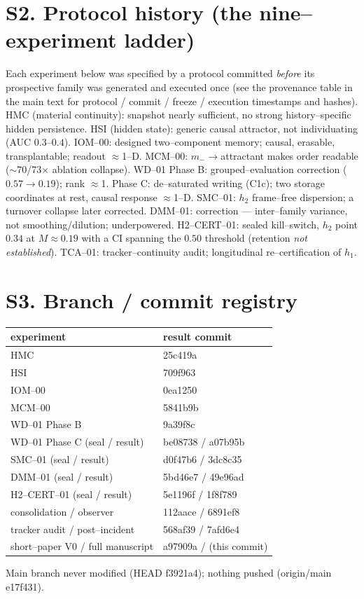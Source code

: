 \documentclass[11pt]{article}
\begin{document}
\section{S2. Protocol history (the nine--experiment ladder)}
Each experiment below was specified by a protocol committed \emph{before} its prospective family was
generated and executed once (see the provenance table in the main text for protocol / commit / freeze /
execution timestamps and hashes). HMC (material continuity): snapshot nearly sufficient, no strong
history--specific hidden persistence. HSI (hidden state): generic causal attractor, not individuating
(AUC $0.3$--$0.4$). IOM--00: designed two--component memory; causal, erasable, transplantable; readout
$\approx$1--D. MCM--00: $m_-\!\to$attractant makes order readable ($\sim$70/73$\times$ ablation collapse).
WD--01 Phase B: grouped--evaluation correction ($0.57\to0.19$); rank $\approx$1. Phase C: de--saturated
writing (C1c); two storage coordinates at rest, causal response $\approx$1--D. SMC--01: $h_2$ frame--free
dispersion; a turnover collapse later corrected. DMM--01: correction --- inter--family variance, not
smoothing/dilution; underpowered. H2--CERT--01: sealed kill--switch, $h_2$ point $0.34$ at $M\approx0.19$
with a CI spanning the $0.50$ threshold (retention \emph{not established}). TCA--01: tracker--continuity
audit; longitudinal re--certification of $h_1$.

\section{S3. Branch / commit registry}
\begin{longtable}{@{}ll@{}}\toprule experiment & result commit\\\midrule
HMC & 25c419a\\ HSI & 709f963\\ IOM--00 & 0ea1250\\ MCM--00 & 5841b9b\\ WD--01 Phase B & 9a39f8c\\
WD--01 Phase C (seal / result) & be08738 / a07b95b\\ SMC--01 (seal / result) & d0f47b6 / 3dc8c35\\
DMM--01 (seal / result) & 5bd46e7 / 49e96ad\\ H2--CERT--01 (seal / result) & 5e1196f / 1f8f789\\
consolidation / observer & 112aace / 6891ef8\\ tracker audit / post--incident & 568af39 / 7afd6e4\\
short--paper V0 / full manuscript & a97909a / (this commit)\\\bottomrule\end{longtable}
Main branch never modified (HEAD f3921a4); nothing pushed (origin/main e17f431).
\end{document}
